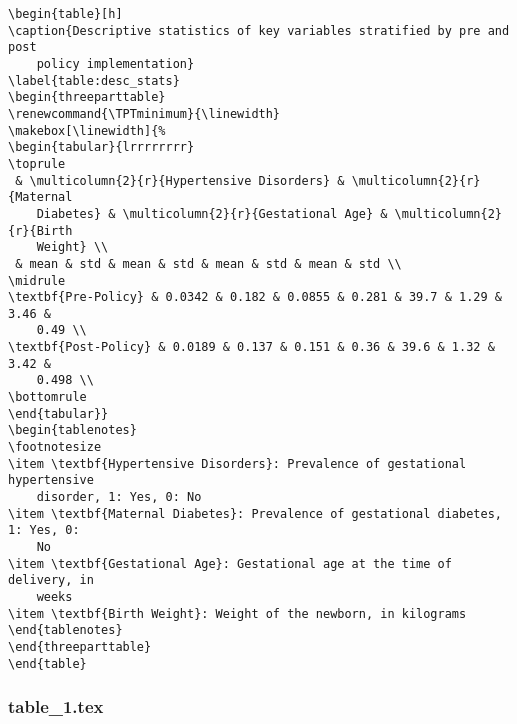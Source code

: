 \documentclass[11pt]{article}
\begin{document}
\begin{Verbatim}[tabsize=4]
\begin{table}[h]
\caption{Descriptive statistics of key variables stratified by pre and post
	policy implementation}
\label{table:desc_stats}
\begin{threeparttable}
\renewcommand{\TPTminimum}{\linewidth}
\makebox[\linewidth]{%
\begin{tabular}{lrrrrrrrr}
\toprule
 & \multicolumn{2}{r}{Hypertensive Disorders} & \multicolumn{2}{r}{Maternal
	Diabetes} & \multicolumn{2}{r}{Gestational Age} & \multicolumn{2}{r}{Birth
	Weight} \\
 & mean & std & mean & std & mean & std & mean & std \\
\midrule
\textbf{Pre-Policy} & 0.0342 & 0.182 & 0.0855 & 0.281 & 39.7 & 1.29 & 3.46 &
	0.49 \\
\textbf{Post-Policy} & 0.0189 & 0.137 & 0.151 & 0.36 & 39.6 & 1.32 & 3.42 &
	0.498 \\
\bottomrule
\end{tabular}}
\begin{tablenotes}
\footnotesize
\item \textbf{Hypertensive Disorders}: Prevalence of gestational hypertensive
	disorder, 1: Yes, 0: No
\item \textbf{Maternal Diabetes}: Prevalence of gestational diabetes, 1: Yes, 0:
	No
\item \textbf{Gestational Age}: Gestational age at the time of delivery, in
	weeks
\item \textbf{Birth Weight}: Weight of the newborn, in kilograms
\end{tablenotes}
\end{threeparttable}
\end{table}

\end{Verbatim}

\subsubsection*{table\_1.tex}
\end{document}
